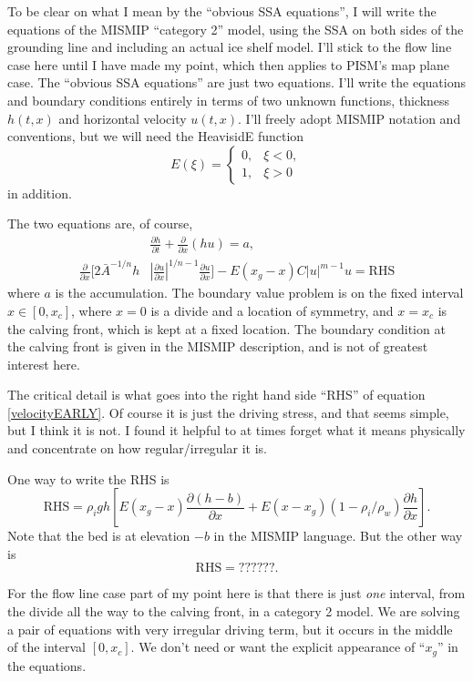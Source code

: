 \documentclass[11pt,final]{amsart}
\newcommand{\ddt}[1]{\ensuremath{\frac{\partial #1}{\partial t}}}
\newcommand{\ddx}[1]{\ensuremath{\frac{\partial #1}{\partial x}}}
\begin{document}
To be clear on what I mean by the ``obvious SSA equations'', I will write the equations of the MISMIP ``category 2'' model, using the SSA \cite{WeisGreveHutter} on both sides of the grounding line and including an actual ice shelf model.  I'll stick to the flow line case here until I have made my point, which then applies to PISM's map plane case.  The ``obvious SSA equations'' are just two equations.  I'll write the equations and boundary conditions entirely in terms of two unknown functions, thickness $h(t,x)$ and horizontal velocity $u(t,x)$.  I'll freely adopt MISMIP notation and conventions, but we will need the HeavisidE function
	$$E(\xi) = \begin{cases} 0, & \xi<0, \\ 1, & \xi> 0 \end{cases}$$
in addition.

The two equations are, of course,
\begin{align}
&\ddt{h} + \ddx{}\left(h u\right) = a, \label{massconserveEARLY} \\
\ddx{}\Big[2 {\bar A}^{-1/n} h &\left|\ddx{u}\right|^{1/n-1} \ddx{u}\Big] - E(x_g-x) C|u|^{m-1} u = \text{RHS} \label{velocityEARLY}
\end{align}
where $a$ is the accumulation.  The boundary value problem is on the fixed interval $x\in[0,x_c]$, where $x=0$ is a divide and a location of symmetry, and $x=x_c$ is the calving front, which is kept at a fixed location.  The boundary condition at the calving front is given in the MISMIP description, and is not of greatest interest here.

The critical detail is what goes into the right hand side ``RHS'' of equation \eqref{velocityEARLY}.  Of course it is just the driving stress, and that seems simple, but I think it is not.  I found it helpful to at times forget what it means physically and concentrate on how regular/irregular it is.

One way to write the RHS is
\begin{equation}
\text{RHS} =  \rho_i g h \left[E(x_g-x) \ddx{(h-b)} + E(x-x_g) (1-\rho_i/\rho_w) \ddx{h}\right]. \label{RHSwxgONE}
\end{equation}
Note that the bed is at elevation $-b$ in the MISMIP language.  But the other way is
\begin{equation}
\text{RHS} =  ??????. \label{RHSwxgTWO}
\end{equation}

For the flow line case part of my point here is that there is just \emph{one} interval, from the divide all the way to the calving front, in a category 2 model.  We are solving a pair of equations with very irregular driving term, but it occurs in the middle of the interval $[0,x_c]$.  We don't need or want the explicit appearance of ``$x_g$'' in the equations.
\end{document}
